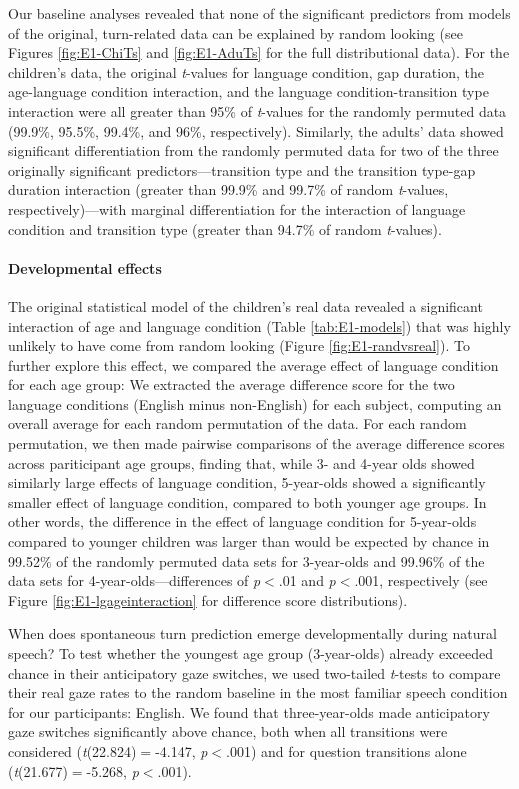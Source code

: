 \documentclass[authoryear, 12pt]{elsarticle}
\begin{document}
Our baseline analyses revealed that none of the significant predictors from models of the original, turn-related data can be explained by random looking (see Figures \ref{fig:E1-ChiTs} and \ref{fig:E1-AduTs} for the full distributional data). For the children's data, the original \textit{t}-values for language condition, gap duration, the age-language condition interaction, and the language condition-transition type interaction were all greater than 95\% of \textit{t}-values for the randomly permuted data (99.9\%, 95.5\%, 99.4\%, and 96\%, respectively). Similarly, the adults' data showed significant differentiation from the randomly permuted data for two of the three originally significant predictors---transition type and the transition type-gap duration interaction (greater than 99.9\% and 99.7\% of random \textit{t}-values, respectively)---with marginal differentiation for the interaction of language condition and transition type (greater than 94.7\% of random \textit{t}-values).

\paragraph{Developmental effects}
The original statistical model of the children's real data revealed a significant interaction of age and language condition (Table \ref{tab:E1-models}) that was highly unlikely to have come from random looking (Figure \ref{fig:E1-randvsreal}). To further explore this effect, we compared the average effect of language condition for each age group: We extracted the average difference score for the two language conditions (English minus non-English) for each subject, computing an overall average for each random permutation of the data. For each random permutation, we then made pairwise comparisons of the average difference scores across pariticipant age groups, finding that, while 3- and 4-year olds showed similarly large effects of language condition, 5-year-olds showed a significantly smaller effect of language condition, compared to both younger age groups. In other words, the difference in the effect of language condition for 5-year-olds compared to younger children was larger than would be expected by chance in 99.52\% of the randomly permuted data sets for 3-year-olds and 99.96\% of the data sets for 4-year-olds---differences of \textit{p}$<$.01 and \textit{p}$<$.001, respectively (see Figure \ref{fig:E1-lgageinteraction} for difference score distributions).

When does spontaneous turn prediction emerge developmentally during natural speech? To test whether the youngest age group (3-year-olds) already exceeded chance in their anticipatory gaze switches, we used two-tailed \textit{t}-tests to compare their real gaze rates to the random baseline in the most familiar speech condition for our participants: English. We found that three-year-olds made anticipatory gaze switches significantly above chance, both when all transitions were considered (\textit{t}(22.824)$=$-4.147, \textit{p}$<$.001) and for question transitions alone (\textit{t}(21.677)$=$-5.268, \textit{p}$<$.001).
\end{document}
